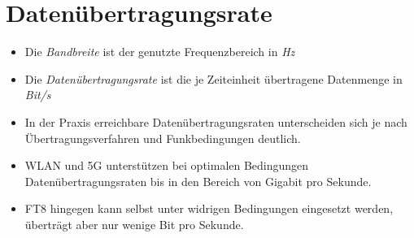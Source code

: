 
\section{Datenübertragungsrate}
\label{section:datenuebertragungsdrate}
\begin{frame}%
\begin{itemize}
  \item Die \emph{Bandbreite} ist der genutzte Frequenzbereich in \emph{Hz}
  \item Die \emph{Datenübertragungsrate} ist die je Zeiteinheit übertragene Datenmenge in \emph{Bit/s}
  \end{itemize}
\end{frame}

\begin{frame}\begin{itemize}
  \item In der Praxis erreichbare Datenübertragungsraten unterscheiden sich je nach Übertragungsverfahren und Funkbedingungen deutlich.
  \item WLAN und 5G unterstützen bei optimalen Bedingungen Datenübertragungsraten bis in den Bereich von Gigabit pro Sekunde.
  \item FT8 hingegen kann selbst unter widrigen Bedingungen eingesetzt werden, überträgt aber nur wenige Bit pro Sekunde.
  \end{itemize}
\end{frame}

\begin{frame}
\end{frame}

